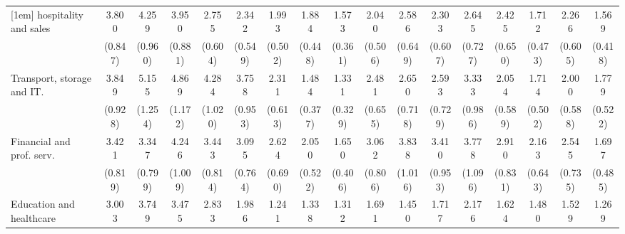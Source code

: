 {\begin{tabular}{l*{16}{c}}
[1em]
hospitality and sales&       3.800\sym{***}&       4.259\sym{***}&       3.950\sym{***}&       2.755\sym{***}&       2.342\sym{***}&       1.993\sym{**} &       1.884\sym{**} &       1.573\sym{*}  &       2.040\sym{**} &       2.586\sym{***}&       2.303\sym{**} &       2.645\sym{***}&       2.425\sym{***}&       1.712         &       2.266\sym{**} &       1.569         \\
                    &     (0.847)         &     (0.960)         &     (0.881)         &     (0.604)         &     (0.549)         &     (0.502)         &     (0.448)         &     (0.361)         &     (0.506)         &     (0.649)         &     (0.607)         &     (0.727)         &     (0.650)         &     (0.473)         &     (0.605)         &     (0.418)         \\
[1em]
Transport, storage and IT.&       3.849\sym{***}&       5.155\sym{***}&       4.869\sym{***}&       4.284\sym{***}&       3.758\sym{***}&       2.311\sym{**} &       1.484         &       1.331         &       2.481\sym{***}&       2.650\sym{***}&       2.593\sym{***}&       3.333\sym{***}&       2.054\sym{*}  &       1.714         &       2.000\sym{*}  &       1.779\sym{*}  \\
                    &     (0.928)         &     (1.254)         &     (1.172)         &     (1.020)         &     (0.953)         &     (0.613)         &     (0.377)         &     (0.329)         &     (0.655)         &     (0.718)         &     (0.729)         &     (0.986)         &     (0.589)         &     (0.502)         &     (0.588)         &     (0.522)         \\
[1em]
Financial and prof. serv.&       3.421\sym{***}&       3.347\sym{***}&       4.246\sym{***}&       3.443\sym{***}&       3.095\sym{***}&       2.624\sym{***}&       2.050\sym{**} &       1.650\sym{*}  &       3.062\sym{***}&       3.838\sym{***}&       3.410\sym{***}&       3.778\sym{***}&       2.910\sym{***}&       2.163\sym{**} &       2.545\sym{**} &       1.697         \\
                    &     (0.819)         &     (0.799)         &     (1.009)         &     (0.814)         &     (0.764)         &     (0.690)         &     (0.522)         &     (0.406)         &     (0.806)         &     (1.016)         &     (0.953)         &     (1.096)         &     (0.831)         &     (0.643)         &     (0.735)         &     (0.485)         \\
[1em]
Education and healthcare&       3.003\sym{***}&       3.749\sym{***}&       3.475\sym{***}&       2.833\sym{***}&       1.986\sym{*}  &       1.241         &       1.338         &       1.312         &       1.691         &       1.450         &       1.717         &       2.176\sym{*}  &       1.624         &       1.480         &       1.529         &       1.269         \\

\end{tabular}}
